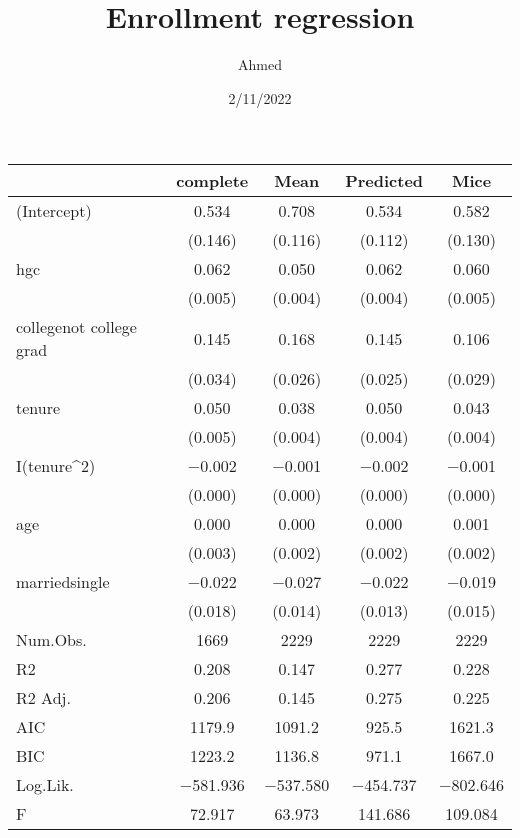 \documentclass[
]{article}
\title{Enrollment regression}
\author{Ahmed}
\date{2/11/2022}
\begin{document}
\begin{table}
\centering
\begin{tabular}[t]{lcccc}
\toprule
  & complete & Mean & Predicted & Mice\\
\midrule
(Intercept) & \num{0.534} & \num{0.708} & \num{0.534} & \num{0.582}\\
 & (\num{0.146}) & (\num{0.116}) & (\num{0.112}) & (\num{0.130})\\
hgc & \num{0.062} & \num{0.050} & \num{0.062} & \num{0.060}\\
 & (\num{0.005}) & (\num{0.004}) & (\num{0.004}) & (\num{0.005})\\
collegenot college grad & \num{0.145} & \num{0.168} & \num{0.145} & \num{0.106}\\
 & (\num{0.034}) & (\num{0.026}) & (\num{0.025}) & (\num{0.029})\\
tenure & \num{0.050} & \num{0.038} & \num{0.050} & \num{0.043}\\
 & (\num{0.005}) & (\num{0.004}) & (\num{0.004}) & (\num{0.004})\\
I(tenure\textasciicircum2) & \num{-0.002} & \num{-0.001} & \num{-0.002} & \num{-0.001}\\
 & (\num{0.000}) & (\num{0.000}) & (\num{0.000}) & (\num{0.000})\\
age & \num{0.000} & \num{0.000} & \num{0.000} & \num{0.001}\\
 & (\num{0.003}) & (\num{0.002}) & (\num{0.002}) & (\num{0.002})\\
marriedsingle & \num{-0.022} & \num{-0.027} & \num{-0.022} & \num{-0.019}\\
 & (\num{0.018}) & (\num{0.014}) & (\num{0.013}) & (\num{0.015})\\
\midrule
Num.Obs. & \num{1669} & \num{2229} & \num{2229} & \num{2229}\\
R2 & \num{0.208} & \num{0.147} & \num{0.277} & \num{0.228}\\
R2 Adj. & \num{0.206} & \num{0.145} & \num{0.275} & \num{0.225}\\
AIC & \num{1179.9} & \num{1091.2} & \num{925.5} & \num{1621.3}\\
BIC & \num{1223.2} & \num{1136.8} & \num{971.1} & \num{1667.0}\\
Log.Lik. & \num{-581.936} & \num{-537.580} & \num{-454.737} & \num{-802.646}\\
F & \num{72.917} & \num{63.973} & \num{141.686} & \num{109.084}\\
\bottomrule
\end{tabular}
\end{table}
\end{document}
